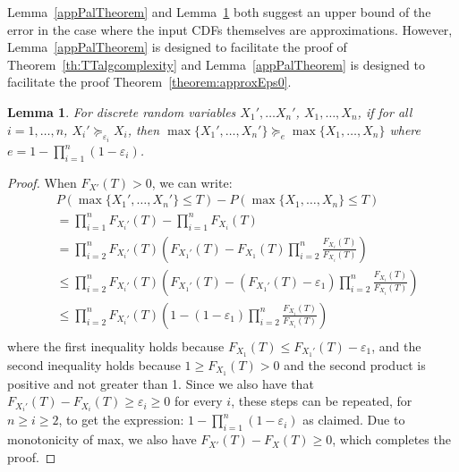 \documentclass[review]{elsarticle}
\newtheorem{lemma}{Lemma}
\begin{document}
Lemma~\ref{appPalTheorem} and Lemma~\ref{tightPalTheorem} both suggest an upper bound of the error in the case where the input CDFs themselves are approximations. However, Lemma~\ref{appPalTheorem} is designed to facilitate the proof of Theorem~\ref{th:TTalgcomplexity} and Lemma~\ref{appPalTheorem} is designed to facilitate the proof Theorem~\ref{theorem:approxEps0}. 
\begin{lemma} \label{tightPalTheorem}
For discrete random variables $X_1', \dots X_n'$, $X_1, \dots,X_n$, if for all $i=1,\dots,n$,  $X_i' \succeq_{\varepsilon_i} X_i$,
then $\max\{X_1',\dots, X_n'\} \succeq_{e} \max\{X_1,\dots,X_n\}$ where $e=1-\prod_{i=1}^n (1-\varepsilon_i)$.
\end{lemma}
\begin{proof}
When $F_{X'}(T) >0$, we can write:
{
\begin{align*} 
&P(\max\{X_1',\dots, X_n'\} {\leq} T) - P(\max\{X_1,\dots, X_n\} {\leq} T)\\
&=\prod_{i=1}^n F_{X_i'}(T)-\prod_{i=1}^n F_{X_i}(T)\\
&= \prod_{i=2}^n F_{X_i'}(T)(F_{X_1'}(T) - 
F_{X_1}(T) \prod_{i=2}^n \frac{F_{X_i}(T)}{F_{X_i}(T)}) \\
&\leq \prod_{i=2}^n F_{X_i'}(T)(F_{X_1'}(T) - 
   (F_{X_1'}(T) - \varepsilon_1)
   \prod_{i=2}^n \frac{F_{X_i}(T)}{F_{X_i}(T)}) \\
&\leq \prod_{i=2}^n F_{X_i'}(T)(1 -  (1 - \varepsilon_1)
   \prod_{i=2}^n \frac{F_{X_i}(T)}{F_{X_i}(T)}) \\
\end{align*}}%
where the first inequality holds because 
$F_{X_1}(T) \leq F_{X_1'}(T) - \varepsilon_1$, and
the second inequality holds because 
$1 \geq F_{X_1}(T) > 0$ and the second product is positive
and not greater than 1. Since we also have 
that $F_{X_i'}(T) - F_{X_i}(T) \geq 
\varepsilon_i \geq 0$ for every $i$, these steps can be repeated, for $n\geq i \geq 2$, to get the expression: 
$1-\prod_{i=1}^n  (1-\varepsilon_i)$ as claimed. 
Due to monotonicity of max,
we also have $F_{X'}(T) - F_{X}(T) \geq 0$, which
completes the proof.
\end{proof}
\end{document}
